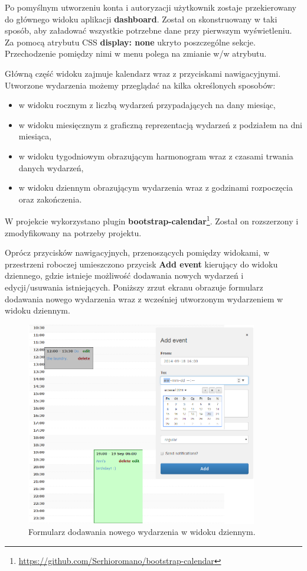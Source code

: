Po pomyślnym utworzeniu konta i autoryzacji użytkownik zostaje przekierowany do głównego widoku aplikacji \textbf{dashboard}. Został on skonstruowany w taki sposób, aby załadować wszystkie potrzebne dane przy pierwszym wyświetleniu. Za pomocą atrybutu CSS \textbf{display: none} ukryto poszczególne sekcje. Przechodzenie pomiędzy nimi w menu polega na zmianie w/w atrybutu.

Główną część widoku zajmuje kalendarz wraz z przyciskami nawigacyjnymi. Utworzone wydarzenia możemy przeglądać na kilka określonych sposobów:

\begin{itemize}
\item w widoku rocznym z liczbą wydarzeń przypadających na dany miesiąc,
\item w widoku miesięcznym z graficzną reprezentacją wydarzeń z podziałem na dni miesiąca,
\item w widoku tygodniowym obrazującym harmonogram wraz z czasami trwania danych wydarzeń,
\item w widoku dziennym obrazującym wydarzenia wraz z godzinami rozpoczęcia oraz zakończenia.
\end{itemize}

W projekcie wykorzystano plugin \textbf{bootstrap-calendar}\footnote{\url{https://github.com/Serhioromano/bootstrap-calendar}}. Został on rozszerzony i zmodyfikowany na potrzeby projektu.

Oprócz przycisków nawigacyjnych, przenoszących pomiędzy widokami, w przestrzeni roboczej umieszczono przycisk \textbf{Add event} kierujący do widoku dziennego, gdzie istnieje możliwość dodawania nowych wydarzeń i edycji/usuwania istniejących. Poniższy zrzut ekranu obrazuje formularz dodawania nowego wydarzenia wraz z wcześniej utworzonym wydarzeniem w widoku dziennym.

\begin{figure}[H]
\centering
\includegraphics[width=0.9\textwidth]{add_event.png}
\caption{Formularz dodawania nowego wydarzenia w widoku dziennym.}
\end{figure}

